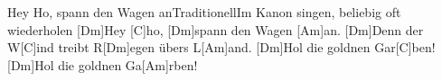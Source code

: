 \documentclass[../main.tex]{subfiles}
\begin{document}
\begin{song}{Hey Ho, spann den Wagen an}{Traditionell}{Im Kanon singen, beliebig oft wiederholen}
[Dm]Hey [C]ho, [Dm]spann den Wagen [Am]an.
[Dm]Denn der W[C]ind treibt R[Dm]egen übers L[Am]and.
[Dm]Hol die goldnen Gar[C]ben!
[Dm]Hol die goldnen Ga[Am]rben!
\end{song}
\end{document}
